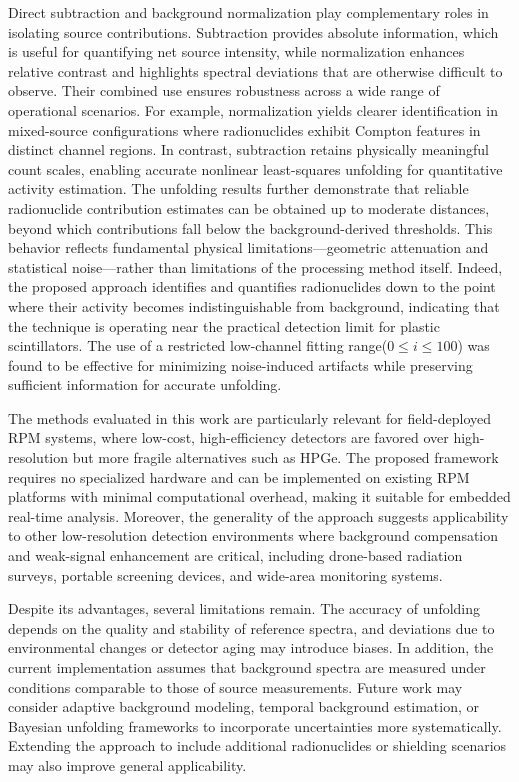 \documentclass[10pt]{wlscirep}
\begin{document}
Direct subtraction and background normalization play complementary roles in isolating source contributions. Subtraction provides absolute information, which is useful for quantifying net source intensity, while normalization enhances relative contrast and highlights spectral deviations that are otherwise difficult to observe. Their combined use ensures robustness across a wide range of operational scenarios. For example, normalization yields clearer identification in mixed-source configurations where radionuclides exhibit Compton features in distinct channel regions. In contrast, subtraction retains physically meaningful count scales, enabling accurate nonlinear least-squares unfolding for quantitative activity estimation.
The unfolding results further demonstrate that reliable radionuclide contribution estimates can be obtained up to moderate distances, beyond which contributions fall below the background-derived thresholds. This behavior reflects fundamental physical limitations—geometric attenuation and statistical noise—rather than limitations of the processing method itself. Indeed, the proposed approach identifies and quantifies radionuclides down to the point where their activity becomes indistinguishable from background, indicating that the technique is operating near the practical detection limit for plastic scintillators. The use of a restricted low-channel fitting range($0\le i \le 100$) was found to be effective for minimizing noise-induced artifacts while preserving sufficient information for accurate unfolding.

The methods evaluated in this work are particularly relevant for field-deployed RPM systems, where low-cost, high-efficiency detectors are favored over high-resolution but more fragile alternatives such as HPGe. The proposed framework requires no specialized hardware and can be implemented on existing RPM platforms with minimal computational overhead, making it suitable for embedded real-time analysis. Moreover, the generality of the approach suggests applicability to other low-resolution detection environments where background compensation and weak-signal enhancement are critical, including drone-based radiation surveys, portable screening devices, and wide-area monitoring systems.

Despite its advantages, several limitations remain. The accuracy of unfolding depends on the quality and stability of reference spectra, and deviations due to environmental changes or detector aging may introduce biases. In addition, the current implementation assumes that background spectra are measured under conditions comparable to those of source measurements. Future work may consider adaptive background modeling, temporal background estimation, or Bayesian unfolding frameworks to incorporate uncertainties more systematically. Extending the approach to include additional radionuclides or shielding scenarios may also improve general applicability.
\end{document}

